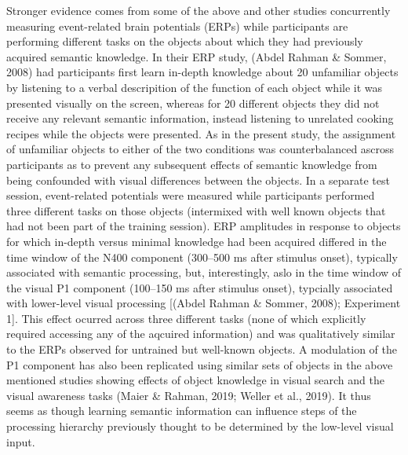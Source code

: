 \documentclass[
  english,
  man,11pt,floatsintext]{apa7}
\begin{document}
Stronger evidence comes from some of the above and other studies concurrently measuring event-related brain potentials (ERPs) while participants are performing different tasks on the objects about which they had previously acquired semantic knowledge. In their ERP study, (Abdel Rahman \& Sommer, 2008) had participants first learn in-depth knowledge about 20 unfamiliar objects by listening to a verbal descripition of the function of each object while it was presented visually on the screen, whereas for 20 different objects they did not receive any relevant semantic information, instead listening to unrelated cooking recipes while the objects were presented. As in the present study, the assignment of unfamiliar objects to either of the two conditions was counterbalanced ascross participants as to prevent any subsequent effects of semantic knowledge from being confounded with visual differences between the objects. In a separate test session, event-related potentials were measured while participants performed three different tasks on those objects (intermixed with well known objects that had not been part of the training session). ERP amplitudes in response to objects for which in-depth versus minimal knowledge had been acquired differed in the time window of the N400 component (300--500 ms after stimulus onset), typically associated with semantic processing, but, interestingly, aslo in the time window of the visual P1 component (100--150 ms after stimulus onset), typcially associated with lower-level visual processing {[}(Abdel Rahman \& Sommer, 2008); Experiment 1{]}. This effect ocurred across three different tasks (none of which explicitly required accessing any of the aqcuired information) and was qualitatively similar to the ERPs observed for untrained but well-known objects. A modulation of the P1 component has also been replicated using similar sets of objects in the above mentioned studies showing effects of object knowledge in visual search and the visual awareness tasks (Maier \& Rahman, 2019; Weller et al., 2019). It thus seems as though learning semantic information can influence steps of the processing hierarchy previously thought to be determined by the low-level visual input.
\end{document}
